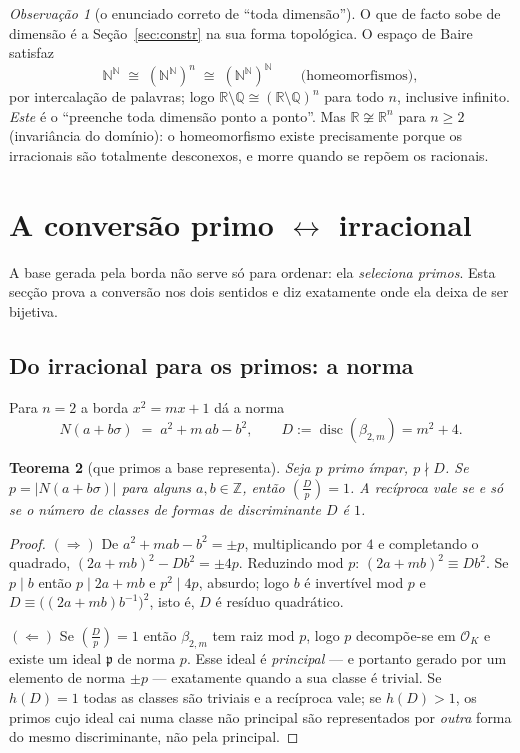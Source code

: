 \documentclass[11pt,a4paper]{article}
\theoremstyle{plain}
\newtheorem{teorema}{Teorema}[section]
\theoremstyle{definition}
\theoremstyle{remark}
\newtheorem{obs}[teorema]{Observação}
\newcommand{\R}{\mathbb{R}}
\newcommand{\Q}{\mathbb{Q}}
\newcommand{\Z}{\mathbb{Z}}
\newcommand{\N}{\mathbb{N}}
\begin{document}
\begin{obs}[o enunciado correto de ``toda dimensão'']\label{obs:naosobe}
O que de facto sobe de dimensão é a Seção~\ref{sec:constr} na sua forma topológica. O espaço de Baire satisfaz
\[
  \N^{\N} \;\cong\; (\N^{\N})^n \;\cong\; (\N^{\N})^{\N}
  \qquad\text{(homeomorfismos)},
\]
por intercalação de palavras; logo $\R\setminus\Q \cong (\R\setminus\Q)^n$ para todo $n$, inclusive
infinito. \emph{Este} é o ``preenche toda dimensão ponto a ponto''. Mas $\R\not\cong\R^n$ para
$n\geq2$ (invariância do domínio): o homeomorfismo existe precisamente porque os irracionais são
totalmente desconexos, e morre quando se repõem os racionais.
\end{obs}


\section{A conversão primo $\leftrightarrow$ irracional}\label{sec:primos}

A base gerada pela borda não serve só para ordenar: ela \emph{seleciona primos}. Esta secção prova
a conversão nos dois sentidos e diz exatamente onde ela deixa de ser bijetiva.

\subsection{Do irracional para os primos: a norma}

Para $n=2$ a borda $x^2 = mx+1$ dá a norma
\[
  N(a+b\sigma) \;=\; a^2 + m\,ab - b^2 , \qquad D := \operatorname{disc}(\beta_{2,m}) = m^2+4 .
\]

\begin{teorema}[que primos a base representa]\label{thm:repr}
Seja $p$ primo ímpar, $p \nmid D$. Se $p = |N(a+b\sigma)|$ para alguns $a,b\in\Z$, então
$\left(\frac{D}{p}\right) = 1$. A recíproca vale \emph{se e só se} o número de classes de formas de
discriminante $D$ é $1$.
\end{teorema}

\begin{proof}
$(\Rightarrow)$ De $a^2+mab-b^2 = \pm p$, multiplicando por $4$ e completando o quadrado,
$(2a+mb)^2 - Db^2 = \pm4p$. Reduzindo mod $p$: $(2a+mb)^2 \equiv Db^2$. Se $p \mid b$ então
$p\mid 2a+mb$ e $p^2 \mid 4p$, absurdo; logo $b$ é invertível mod $p$ e $D \equiv
\big((2a+mb)b^{-1}\big)^2$, isto é, $D$ é resíduo quadrático.

$(\Leftarrow)$ Se $\left(\frac{D}{p}\right)=1$ então $\beta_{2,m}$ tem raiz mod $p$, logo $p$
decompõe-se em $\mathcal O_K$ e existe um ideal $\mathfrak p$ de norma $p$. Esse ideal é
\emph{principal} --- e portanto gerado por um elemento de norma $\pm p$ --- exatamente quando a sua
classe é trivial. Se $h(D)=1$ todas as classes são triviais e a recíproca vale; se $h(D)>1$, os
primos cujo ideal cai numa classe não principal são representados por \emph{outra} forma do
mesmo discriminante, não pela principal.
\end{proof}
\end{document}
